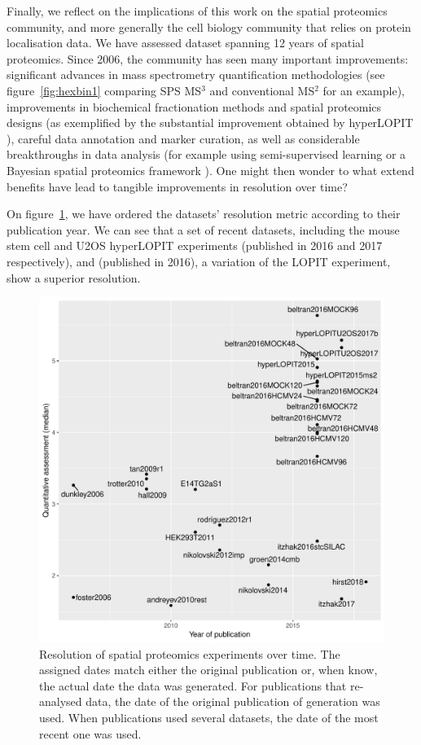 \documentclass[12pt]{article}\usepackage[]{graphicx}\usepackage[]{color}
\newenvironment{knitrout}{}{} %
\begin{document}
\bigskip

Finally, we reflect on the implications of this work on the spatial
proteomics community, and more generally the cell biology community
that relies on protein localisation data. We have assessed dataset
spanning 12 years of spatial proteomics. Since 2006, the community has
seen many important improvements: significant advances in mass
spectrometry quantification methodologies (see
figure~\ref{fig:hexbin1} comparing SPS MS$^3$ and conventional MS$^2$
for an example), improvements in biochemical fractionation methods and
spatial proteomics designs (as exemplified by the substantial
improvement obtained by hyperLOPIT \citep{Christoforou:2016}), careful
data annotation and marker curation, as well as considerable
breakthroughs in data analysis (for example using semi-supervised
learning \cite{Breckels:2013} or a Bayesian spatial proteomics
framework \cite{Crook:2018}). One might then wonder to what extend
benefits have lead to tangible improvements in resolution over time?

On figure~\ref{fig:restime}, we have ordered the datasets' resolution
metric according to their publication year. We can see that a set of
recent datasets, including the mouse stem cell
\citep{Christoforou:2016} and U2OS \citep{Thul:2017} hyperLOPIT
experiments (published in 2016 and 2017 respectively), and
\citep{JeanBeltran:2016} (published in 2016), a variation of the LOPIT
experiment, show a superior resolution.

\begin{figure}[h]
  \centering
\begin{knitrout}
\color{fgcolor}
\includegraphics[width=0.6\linewidth]{figure/restime-1} 

\end{knitrout}
\caption{Resolution of spatial proteomics experiments over time. The
  assigned dates match either the original publication or, when know,
  the actual date the data was generated. For publications that
  re-analysed data, the date of the original publication of generation
  was used. When publications used several datasets, the date of the
  most recent one was used. }
  \label{fig:restime}
\end{figure}
\end{document}
